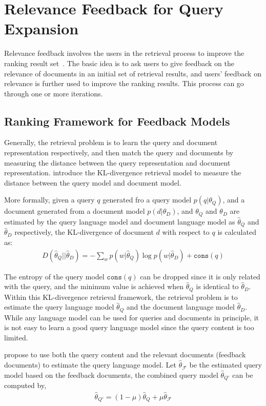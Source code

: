 \section{Relevance Feedback for Query Expansion}

Relevance feedback involves the users in the retrieval process to improve the ranking result set~\citep{Rocchio-1971}. The basic idea is to ask users to give feedback on the relevance of documents in an initial set of retrieval results, and users' feedback on relevance is further used to improve the ranking results. This process can go through one or more iterations. 

\subsection{Ranking Framework for Feedback Models}

Generally, the retrieval problem is to learn the query and document representation respectively, and then match the query and documents by measuring the distance between the query representation and document representation. \cite{Lafferty-2001} introduce the KL-divergence retrieval model to measure the distance between the query model and document model.

More formally, given a query $q$ generated fro a query model $p(q|\theta_Q)$, and a document generated from a document model $p(d|\theta_D)$, and $\theta_Q$ and $\theta_D$ are estimated by the query language model and document language model as $\hat{\theta}_Q$ and $\hat{\theta}_D$ respectively, the KL-divergence of document $d$ with respect to $q$ is calculated as:
\begin{align}
D(\hat{\theta}_Q || \hat{\theta}_D) = -\sum_w p(w|\hat{\theta}_Q) \log p(w | \hat{\theta}_D) + \texttt{cons}(q)
\end{align}

The entropy of the query model $\texttt{cons}(q)$ can be dropped since it is only related with the query, and the minimum value is achieved when $\hat{\theta}_Q$ is identical to $\hat{\theta}_D$. Within this KL-divergence retrieval framework, the retrieval problem is to estimate the query language model $\hat{\theta}_Q$ and the document language model $\hat{\theta}_D$. While any language model can be used for queries and documents in principle, it is not easy to learn a good query language model since the query content is too limited. 

\cite{zhai-01b} propose to use both the query content and the relevant documents (feedback documents) to estimate the query language model. Let $\hat{\theta}_{\mathcal{F}}$ be the estimated query model based on the feedback documents, the combined query model $\hat{\theta}_{Q'}$ can be computed by,
\begin{align}
\hat{\theta}_{Q'} = (1 - \mu)\hat{\theta}_{Q} + \mu \hat{\theta}_{\mathcal{F}}
\end{align}

